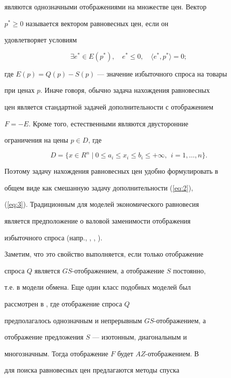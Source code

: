 являются однозначными отображениями на множестве цен. Вектор


$p^{*} \geq 0$  называется вектором равновесных цен, если он


удовлетворяет условиям


$$


\exists  e^{*}\in E(p^{*}), \quad    e^{*}\le 0, \quad


\langle e^{*}, p^{*} \rangle = 0;


$$


где $E(p) = Q(p)- S(p)$ --- значение избыточного спроса на товары


при ценах $p$. Иначе говоря, обычно задача нахождения равновесных


цен является стандартной задачей дополнительности с отображением


$F=-E$. Кроме того, естественными являются двусторонние


ограничения на цены $p \in D$, где


$$


D=\{x \in R^n \mid 0 \le a_i \le x_i \le b_i \le +\infty,\ \


i=1,\dotsc,n\}.


$$


Поэтому задачу нахождения равновесных цен удобно формулировать в


общем виде как смешанную задачу дополнительности  (\ref{eq:2}),


(\ref{eq:3}). Традиционным для моделей экономического равновесия


является предположение о валовой заменимости отображения


избыточного спроса (напр., \cite{Nik72}, \cite{How80}, \cite{PS82}).


Заметим, что это свойство выполняется, если только отображение


спроса $Q$ является $GS$-отображением, а отображение $S$ постоянно,


т.е. в модели обмена. Еще один класс подобных моделей был


рассмотрен в \cite{KV02}, где отображение спроса $Q$


предполагалось однозначным и непрерывным $GS$-отображением, а


отображение предложения $S$ --- изотонным, диагональным и


многозначным. Тогда отображение $F$ будет $AZ$-отображением. В


\cite{KV02} для поиска равновесных цен предлагаются методы спуска


